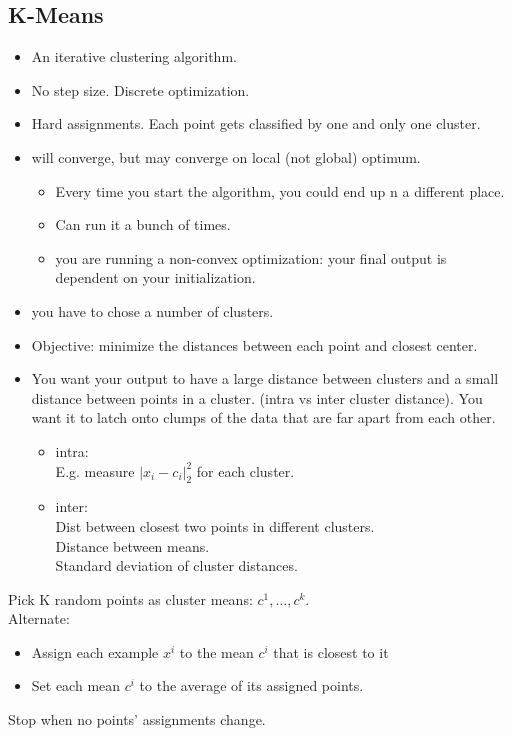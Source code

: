 \subsection{K-Means}
\begin{itemize}
	\item An iterative clustering algorithm.  \hfill \\
	\item No step size.  Discrete optimization. 
	\item Hard assignments.  Each point gets classified by one and only one cluster. 
	\item will converge, but may converge on local (not global) optimum.
		\begin{itemize}
			\item Every time you start the algorithm, you could end up n a different place.
			\item Can run it a bunch of times. %
			\item you are running a non-convex optimization: your final output is dependent on your initialization.
		\end{itemize}
	\item you have to chose a number of clusters. 
	\item Objective: minimize the distances between each point and closest center. 
	\item You want your output to have a large distance between clusters and a small distance between points in a cluster.  (intra vs inter cluster distance).
	You want it to latch onto clumps of the data that are far apart from each other. %
		\begin{itemize}
			\item intra: \hfill \\
				E.g. measure $|x_i - c_i|_2^2$ for each cluster. 
			\item inter:  \hfill \\
				Dist between closest two points in different clusters. \hfill \\
				Distance between means.  \hfill \\
				Standard deviation of cluster distances. \hfill \\
		\end{itemize}
\end{itemize}	
	
Pick K random points as cluster means: $c^1, \dots, c^k$.  \hfill \\
Alternate:
\begin{itemize}
	\item Assign each example $x^i$ to the mean $c^i$ that is closest to it
	\item Set each mean $c^i$ to the average of its assigned points. 
\end{itemize}
Stop when no points' assignments change. \hfill \\

